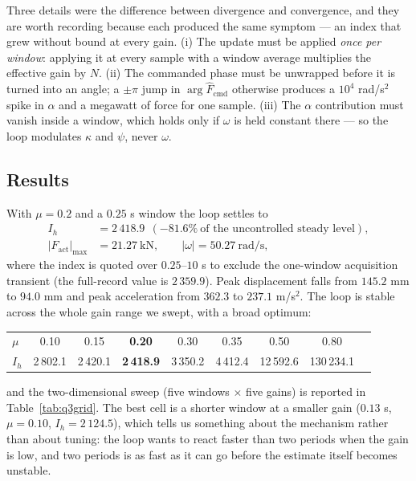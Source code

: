\documentclass[12pt]{apmcmthesis}
\begin{document}
Three details were the difference between divergence and convergence, and they are worth recording
because each produced the same symptom --- an index that grew without bound at every gain.
(i) The update must be applied \emph{once per window}: applying it at every sample with a window
average multiplies the effective gain by $N$. (ii) The commanded phase must be unwrapped before it
is turned into an angle; a $\pm\pi$ jump in $\arg\hat F_{\text{cmd}}$ otherwise produces a
$10^4$ rad/s$^2$ spike in $\alpha$ and a megawatt of force for one sample.
(iii) The $\alpha$ contribution must vanish inside a window, which holds only if $\omega$ is held
constant there --- so the loop modulates $\kappa$ and $\psi$, never $\omega$.

\subsection{Results}
With $\mu=0.2$ and a $0.25$ s window the loop settles to
\begin{equation}
\begin{aligned}
I_h&=2\,418.9\ \ (-81.6\%\ \text{of the uncontrolled steady level}),\\
|F_{\text{act}}|_{\max}&=21.27\ \text{kN},\qquad |\omega|=50.27\ \text{rad/s},
\end{aligned}
\end{equation}
where the index is quoted over $0.25$--$10$ s to exclude the one-window acquisition transient
(the full-record value is $2\,359.9$). Peak displacement falls from $145.2$ mm to $94.0$ mm and
peak acceleration from $362.3$ to $237.1$ m/s$^2$. The loop is stable across the whole gain range
we swept, with a broad optimum:
\begin{center}
\begin{tabular}{@{}lcccccccc@{}}
\toprule
$\mu$ & 0.10 & 0.15 & \textbf{0.20} & 0.30 & 0.35 & 0.50 & 0.80 \\
$I_h$ & 2\,802.1 & 2\,420.1 & \textbf{2\,418.9} & 3\,350.2 & 4\,412.4 & 12\,592.6 & 130\,234.1 \\
\bottomrule
\end{tabular}
\end{center}
and the two-dimensional sweep (five windows $\times$ five gains) is reported in
Table~\ref{tab:q3grid}. The best cell is a shorter window at a smaller gain ($0.13$ s,
$\mu=0.10$, $I_h=2\,124.5$), which tells us something about the mechanism rather than about
tuning: the loop wants to react faster than two periods when the gain is low, and two periods is
as fast as it can go before the estimate itself becomes unstable.
\end{document}
